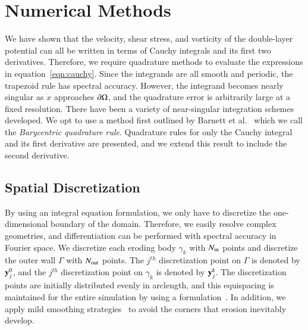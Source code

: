 \documentclass[preprint, 10pt]{elsarticle}
\begin{document}
\section{Numerical Methods}
\label{sec:method}
We have shown that the velocity, shear stress, and vorticity of the
double-layer potential can all be written in terms of Cauchy integrals
and its first two derivatives.  Therefore, we require quadrature methods
to evaluate the expressions in equation~\eqref{eqn:cauchy}.  Since the
integrands are all smooth and periodic, the trapezoid rule has spectral
accuracy.  However, the integrand becomes nearly singular as $x$
approaches ${\partial}\Omega$, and the quadrature error is arbitrarily large at
a fixed resolution.  There have been a variety of near-singular
integration schemes developed.   We opt to use a method first outlined
by Barnett et al.~\cite{bar-wu-vee2015} which we call the {\em
Barycentric quadrature rule}.  Quadrature rules for only the Cauchy
integral and its first derivative are presented, and we extend this
result to include the second derivative.


\subsection{Spatial Discretization}
\label{sec:spatialDiscretization}
By using an integral equation formulation, we only have to discretize
the one-dimensional boundary of the domain.  Therefore, we easily
resolve complex geometries, and differentiation can be performed with
spectral accuracy in Fourier space.  We discretize each eroding body
$\gamma_k$ with $N_{\mathrm{in}}$ points and discretize the outer wall $\Gamma$
with $N_{\mathrm{out}}$ points.  The $j^{th}$ discretization point on $\Gamma$ is
denoted by ${\mathbf{y}}_j^0$, and the $j^{th}$ discretization point on
$\gamma_k$ is denoted by ${\mathbf{y}}^k_j$.  The discretization points are
initially distributed evenly in arclength, and this equispacing is
maintained for the entire simulation by using a {\thL}
formulation~\cite{hou-low-she1994}.  In addition, we apply mild
smoothing strategies~\cite{qua-moo2018} to avoid the corners that
erosion inevitably develop.  
\end{document}
